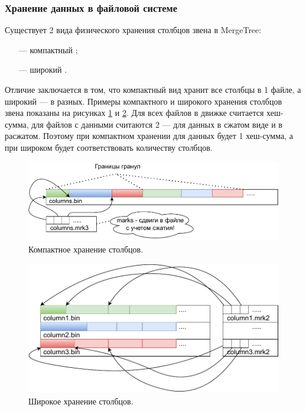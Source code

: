 \subsubsection{Хранение данных в файловой системе}

Существует 2 вида физического хранения столбцов звена в MergeTree:
\begin{itemize}
    \item [---] компактный \cite{datapartcompact};
    \item [---] широкий \cite{datapartwide}.
\end{itemize}

Отличие заключается в том, что компактный вид хранит все столбцы в 1 файле, а широкий --- в разных. Примеры компактного и широкого хранения столбцов звена показаны на рисунках \ref{fig:compactstore} и \ref{fig:widestore}. Для всех файлов в движке считается хеш-сумма, для файлов с данными считаются 2 --- для данных в сжатом виде и в расжатом. Поэтому при компактном хранении для данных будет 1 хеш-сумма, а при широком будет соответствовать количеству столбцов.

\begin{figure}[hbtp]
	\centering
	\includegraphics[width=\textwidth]{img/compactstore.pdf}
	\caption{Компактное хранение столбцов.}
	\label{fig:compactstore}
\end{figure}

\begin{figure}[hbtp]
	\centering
	\includegraphics[width=\textwidth]{img/widestore.pdf}
	\caption{Широкое хранение столбцов.}
	\label{fig:widestore}
\end{figure}

